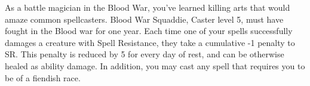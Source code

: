  {}
\shortdescfeat
{As a battle magician in the Blood War, you've learned killing arts that would amaze common spellcasters.}
{Blood War Squaddie, Caster level 5, must have fought in the Blood war for one year.}
{Each time one of your spells successfully damages a creature with Spell Resistance, they take a cumulative -1 penalty to SR. This penalty is reduced by 5 for every day of rest, and can be otherwise healed as ability damage. In addition, you may cast any spell that requires you to be of a fiendish race.}